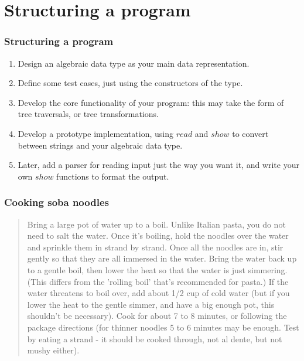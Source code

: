 \documentclass{beamer}
\begin{document}
\section{Structuring a program}
\begin{frame}
\frametitle{Structuring a program} 

\begin{enumerate}
\item Design an algebraic data type as your main data
  representation.
\item Define some test cases, just using the constructors of the
  type.
\item Develop the core functionality of your program: this may take
  the form of tree traversals, or tree transformations.
\item Develop a prototype implementation, using $read$ and $show$
  to convert between strings and your algebraic data type.
\item Later, add a parser for reading input just the way you want
  it, and write your own $show$ functions to format the output.
\end{enumerate}

\end{frame}
\begin{frame}[fragile]
\frametitle{Cooking soba noodles}
\begin{quote}

Bring a large pot of water up to a boil. Unlike Italian pasta, you do not need to salt the water. Once it's boiling, hold the noodles over the water and sprinkle them in strand by strand.
Once all the noodles are in, stir gently so that they are all immersed in the water.
Bring the water back up to a gentle boil, then lower the heat so that the water is just simmering. (This differs from the 'rolling boil' that's recommended for pasta.) If the water threatens to boil over, add about 1/2 cup of cold water (but if you lower the heat to the gentle simmer, and have a big enough pot, this shouldn't be necessary). Cook for about 7 to 8 minutes, or following the package directions (for thinner noodles 5 to 6 minutes may be enough. Test by eating a strand - it should be cooked through, not al dente, but not mushy either).

\end{quote}

\end{frame}
\end{document}
